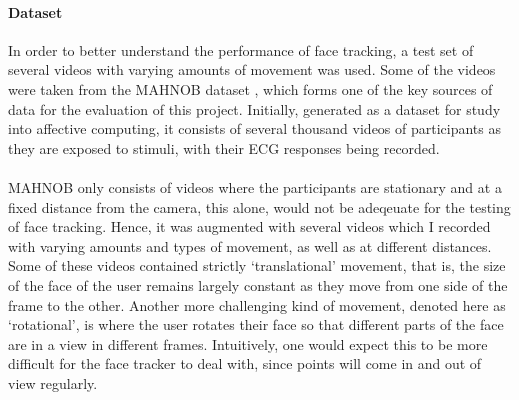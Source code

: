\paragraph{Dataset}
In order to better understand the performance of face tracking, a test set of several videos with varying amounts of movement was used. Some of the videos were taken from the MAHNOB dataset \cite{Mahnob}, which forms one of the key sources of data for the evaluation of this project.
Initially, generated as a dataset for study into affective computing, it consists of several thousand videos of participants as they are exposed to stimuli, with their ECG responses being recorded. 
\\\\
MAHNOB \cite{Mahnob} only consists of videos where the participants are stationary and at a fixed distance from the camera, this alone, would not be adeqeuate for the testing of face tracking. Hence, it was augmented with several videos which I recorded with varying amounts and types of movement, as well as at different distances.
Some of these videos contained strictly `translational' movement, that is, the size of the face of the user remains largely constant as they move from one side of the frame to the other.
Another more challenging kind of movement, denoted here as `rotational', is where the user rotates their face so that different parts of the face are in a view in different frames.
Intuitively, one would expect this to be more difficult for the face tracker to deal with, since points will come in and out of view regularly.
